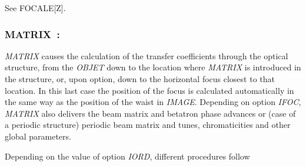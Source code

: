 \noindent See FOCALE[Z]. 


\vfill



\newpage

\subsubsection*{MATRIX~: \MATRIXTitl}\label{MATRIX} 
\medskip

\textsl{MATRIX}  causes the calculation of the transfer coefficients through the optical 
structure, from the \textsl{OBJET} down to the location where \textsl{MATRIX}  is introduced in the structure, or, 
upon option, down to the horizontal focus closest to that location.  
In this last case the position of 
the focus is calculated automatically in the same way as the position of the 
waist in \textsl{IMAGE}. Depending on option \textsl{IFOC},  \textsl{MATRIX} also
delivers the beam matrix and betatron phase advances or (case of a periodic structure) periodic beam matrix and tunes, 
chromaticities  and other global parameters. 



\medskip

\noindent Depending on the value of option \textsl{IORD}, different procedures follow   

\medskip

